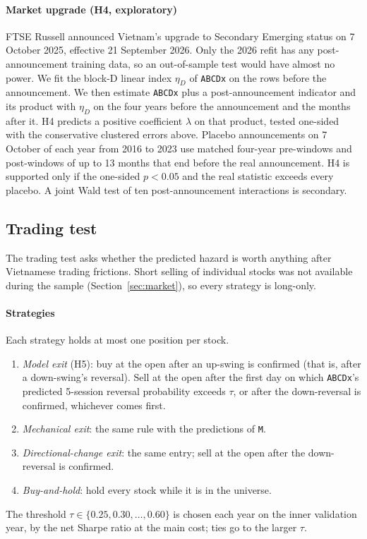 \paragraph{Market upgrade (H4, exploratory)} FTSE Russell announced Vietnam's upgrade to Secondary
Emerging status on 7 October 2025, effective 21 September 2026. Only the 2026 refit has any
post-announcement training data, so an out-of-sample test would have almost no power. We fit the
block-D linear index $\eta_D$ of \texttt{ABCDx} on the rows before the announcement. We then
estimate \texttt{ABCDx} plus a post-announcement indicator and its product with $\eta_D$ on the
four years before the announcement and the months after it. H4 predicts a positive coefficient
$\lambda$ on that product, tested one-sided with the conservative clustered errors above. Placebo
announcements on 7 October of each year from 2016 to 2023 use matched four-year pre-windows and
post-windows of up to 13 months that end before the real announcement. H4 is supported only if the
one-sided $p<0.05$ and the real statistic exceeds every placebo. A joint Wald test of ten
post-announcement interactions is secondary.

\subsection{Trading test}\label{sec:trading}

The trading test asks whether the predicted hazard is worth anything after Vietnamese trading
frictions. Short selling of individual stocks was not available during the sample
(Section~\ref{sec:market}), so every strategy is
long-only.

\paragraph{Strategies} Each strategy holds at most one position per stock.
\begin{enumerate}
\item \emph{Model exit} (H5): buy at the open after an up-swing is confirmed (that is, after a down-swing's reversal). Sell at the open after
  the first day on which \texttt{ABCDx}'s predicted 5-session reversal probability exceeds $\tau$,
  or after the down-reversal is confirmed, whichever comes first.
\item \emph{Mechanical exit}: the same rule with the predictions of \texttt{M}.
\item \emph{Directional-change exit}: the same entry; sell at the open after the down-reversal is
  confirmed.
\item \emph{Buy-and-hold}: hold every stock while it is in the universe.
\end{enumerate}
The threshold $\tau\in\{0.25,0.30,\dots,0.60\}$ is chosen each year on the inner validation year, by
the net Sharpe ratio at the main cost; ties go to the larger $\tau$.

